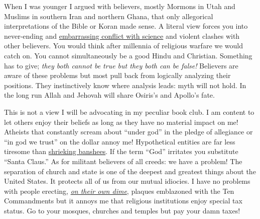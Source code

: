 When I was younger I argued with believers, mostly Mormons in Utah and
Muslims in southern Iran and northern Ghana, that only allegorical
interpretations of the Bible or Koran made sense. A literal view forces
you into never-ending and
\href{http://christiananswers.net/q-aig/aig-c005.html}{embarrassing
conflict with science} and violent clashes with other believers. You
would think after millennia of religious warfare we would catch on. You
cannot simultaneously be a good Hindu and Christian. Something has to
give; \emph{they both cannot be true but they both can be false!}
Believers are aware of these problems but most pull back from logically
analyzing their positions. They instinctively know where analysis leads:
myth will not hold. In the long run Allah and Jehovah will share
Osiris's and Apollo's fate.

This is not a view I will be advocating in my peculiar book club. I am
content to let others enjoy their beliefs as long as they have no
material impact on me! Atheists that constantly scream about ``under
god'' in the pledge of allegiance or ``in god we trust'' on the dollar
annoy me! Hypothetical entities are far less tiresome than
\href{http://www.youtube.com/watch?v=9gRLR3W8Ons}{shrieking banshees}.
If the term ``God'' irritates you substitute ``Santa Claus.'' As for
militant believers of all creeds: we have a problem! The separation of
church and state is one of the deepest and greatest things about the
United States. It protects all of us from our mutual idiocies. I have no
problems with people erecting,
\emph{\href{http://www.secularnewsdaily.com/2010/11/10/obama-administration-taxpayers-lack-standing-in-tax-subsidized-religion-cases/}{on
their own dime}}, plaques emblazoned with the Ten Commandments but it
annoys me that religious institutions enjoy special tax status. Go to
your mosques, churches and temples but pay your damn taxes!




%